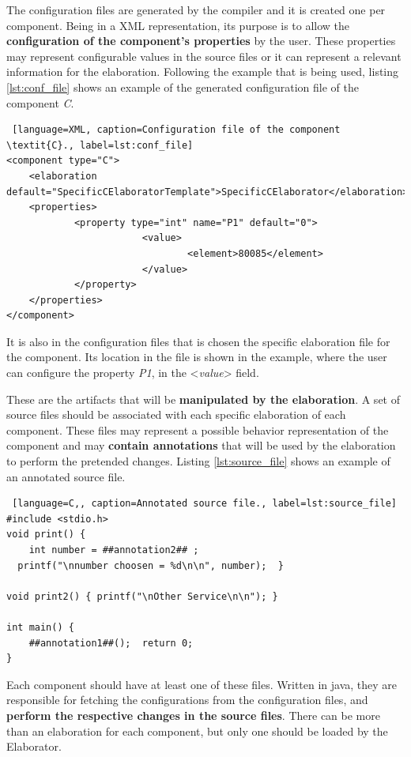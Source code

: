 
The configuration files are generated by the compiler and it is created one per component. Being in a XML representation, its purpose is to allow the \textbf{configuration of the component's properties} by the user. These properties may represent configurable values in the source files or it can represent a relevant information for the elaboration. Following the example that is being used, listing \ref{lst:conf_file} shows an example of the generated configuration file of the component \textit{C}.

\begin{lstlisting} [language=XML, caption=Configuration file of the component \textit{C}., label=lst:conf_file]
<component type="C">
	<elaboration default="SpecificCElaboratorTemplate">SpecificCElaborator</elaboration>
	<properties>
			<property type="int" name="P1" default="0">
						<value>
								<element>80085</element>
						</value>
			</property>
	</properties>
</component>
\end{lstlisting}

It is also in the configuration files that is chosen the specific elaboration file for the component. Its location in the file is shown in the example, where the user can configure the property \textit{P1}, in the <\textit{value}> field.


These are the artifacts that will be \textbf{manipulated by the elaboration}. A set of source files should be associated with each specific elaboration of each component. These files may represent a possible behavior representation of the component and may \textbf{contain annotations} that will be used by the elaboration to perform the pretended changes. Listing \ref{lst:source_file} shows an example of an annotated source file.

\begin{lstlisting} [language=C,, caption=Annotated source file., label=lst:source_file]
#include <stdio.h>
void print() {
	int number = ##annotation2## ;
  printf("\nnumber choosen = %d\n\n", number);  }
    
void print2() { printf("\nOther Service\n\n"); }

int main() {
	##annotation1##();  return 0;
}
\end{lstlisting}


Each component should have at least one of these files. Written in java, they are responsible for fetching the configurations from the configuration files, and \textbf{perform the respective changes in the source files}. There can be more than an elaboration for each component, but only one should be loaded by the Elaborator. 

